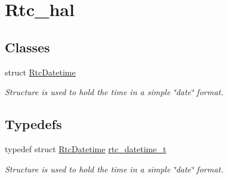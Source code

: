 \hypertarget{group__rtc__hal}{}\section{Rtc\+\_\+hal}
\label{group__rtc__hal}
\subsection*{Classes}
\begin{DoxyCompactItemize}
\item 
struct \hyperlink{structRtcDatetime}{Rtc\+Datetime}
\begin{DoxyCompactList}\small\item\em Structure is used to hold the time in a simple \char`\"{}date\char`\"{} format. \end{DoxyCompactList}\end{DoxyCompactItemize}
\subsection*{Typedefs}
\begin{DoxyCompactItemize}
\item 
typedef struct \hyperlink{structRtcDatetime}{Rtc\+Datetime} \hyperlink{group__rtc__hal_ga079a66794dec7b821f9f5fdb6c7c8642}{rtc\+\_\+datetime\+\_\+t}\hypertarget{group__rtc__hal_ga079a66794dec7b821f9f5fdb6c7c8642}{}\label{group__rtc__hal_ga079a66794dec7b821f9f5fdb6c7c8642}

\begin{DoxyCompactList}\small\item\em Structure is used to hold the time in a simple \char`\"{}date\char`\"{} format. \end{DoxyCompactList}\end{DoxyCompactItemize}
